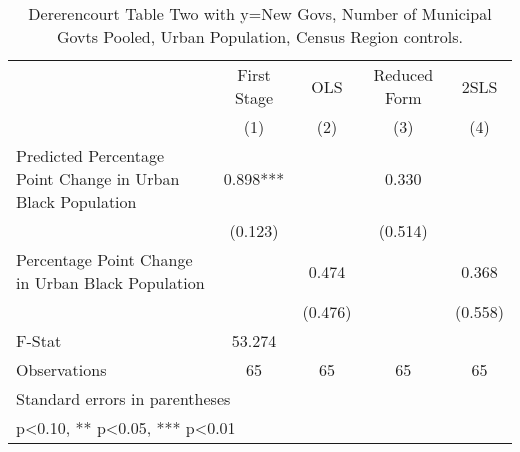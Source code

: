 \begin{table}[htbp]\centering
\def\sym#1{\ifmmode^{#1}\else\(^{#1}\)\fi}
\caption{Dererencourt Table Two with y=New Govs, Number of Municipal Govts  Pooled, Urban Population, Census Region controls.}
\begin{tabular}{l*{4}{c}}
\toprule
                    & First Stage   &         OLS   &Reduced Form   &        2SLS   \\
                    &\multicolumn{1}{c}{(1)}   &\multicolumn{1}{c}{(2)}   &\multicolumn{1}{c}{(3)}   &\multicolumn{1}{c}{(4)}   \\
\midrule
Predicted Percentage Point Change in Urban Black Population&       0.898***&               &       0.330   &               \\
                    &     (0.123)   &               &     (0.514)   &               \\
\addlinespace
Percentage Point Change in Urban Black Population&               &       0.474   &               &       0.368   \\
                    &               &     (0.476)   &               &     (0.558)   \\
\midrule
F-Stat              &      53.274   &               &               &               \\
Observations        &          65   &          65   &          65   &          65   \\
\bottomrule
\multicolumn{5}{l}{\footnotesize Standard errors in parentheses}\\
\multicolumn{5}{l}{\footnotesize * p<0.10, ** p<0.05, *** p<0.01}\\
\end{tabular}
\end{table}

